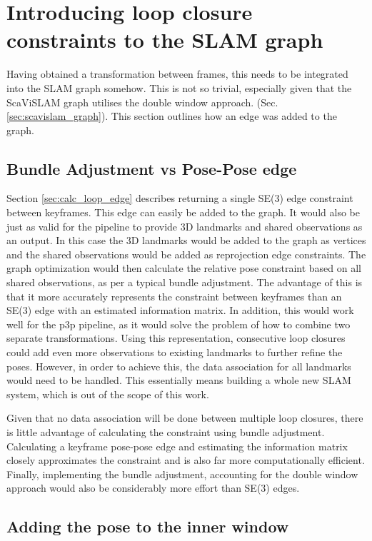 \section{Introducing loop closure constraints to the SLAM graph}

Having obtained a transformation between frames, this needs to be integrated into the SLAM graph somehow.  This is not so trivial, especially given that the ScaViSLAM graph utilises the double window approach.  (Sec. \ref{sec:scavislam_graph}).  This section outlines how an edge was added to the graph.

\subsection{Bundle Adjustment vs Pose-Pose edge}

Section \ref{sec:calc_loop_edge} describes returning a single SE(3) edge constraint between keyframes.  This edge can easily be added to the graph.  It would also be just as valid for the pipeline to provide 3D landmarks and shared observations as an output.  In this case the 3D landmarks would be added to the graph as vertices and the shared observations would be added as reprojection edge constraints.  The graph optimization would then calculate the relative pose constraint based on all shared observations, as per a typical bundle adjustment.  The advantage of this is that it more accurately represents the constraint between keyframes than an SE(3) edge  with an estimated information matrix.  In addition, this would work well for the p3p pipeline, as it would solve the problem of how to combine two separate transformations.  Using this representation, consecutive loop closures could add even more observations to existing landmarks to further refine the poses.  However, in order to achieve this, the data association for all landmarks would need to be handled.  This essentially means building a whole new SLAM system, which is out of the scope of this work.

Given that no data association will be done between multiple loop closures, there is little advantage of calculating the constraint using bundle adjustment.  Calculating a keyframe pose-pose edge and estimating the information matrix closely approximates the constraint and is also far more computationally efficient.  Finally, implementing the bundle adjustment, accounting for the double window approach would also be considerably more effort than SE(3) edges.

\subsection{Adding the pose to the inner window}

